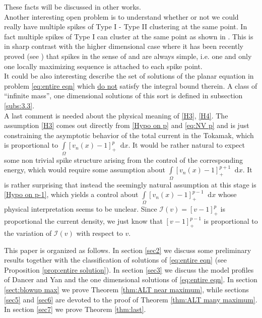 \documentclass[10pt]{amsart}
\newcommand{\dd}{\mathop{}\!\mathrm{d}}
\newcommand{\un}[1]{\underline{#1}}
\begin{document}
These facts will be discussed in other works.\\


Another interesting open problem is to understand whether or not we could really have multiple spikes of Type I - Type II
clustering at the same point. In fact multiple spikes of Type I can cluster at the same point as shown in \cite{DY}.
This is in sharp contrast with the higher dimensional case where it has been recently proved (see \cite{CM})
that spikes in the sense of \cite{FW} and \cite{W}  are always simple, i.e. one and only
one locally maximizing sequence is attached to each spike point.\\


It could be also interesting describe the set of solutions of the planar equation in problem \eqref{eq:entire eqn} which \un{do not} satisfy the integral
bound therein. A class of ``infinite mass'', one dimensional solutions of this sort is defined in subsection \ref{subs:3.3}.\\


A last comment is needed about the physical meaning of \eqref{H3}, \eqref{H4}. The assumption \eqref{H3} comes out directly from
\eqref{Hypo on p} and \eqref{eq:NV p} and is just constraining the asymptotic behavior of the total current in the Tokamak, which is proportional to
$\int\limits_{\Omega} [v_n(x)-1]_+^p\dd{x}$. It would be rather natural to expect some non trivial spike structure arising from
the control of the corresponding energy, which would require some assumption about $\int\limits_{\Omega} [v_n(x)-1]_+^{p+1}\dd{x}$.
It is rather surprising that instead the seemingly natural assumption at this stage is \eqref{Hypo on p-1}, which yields a control
about $\int\limits_{\Omega} [v_n(x)-1]_+^{p-1}\dd{x}$ whose physical interpretation seems to be unclear. Since
$\mathcal{I}(v)=[v-1]^p_+$ is proportional the current density, we just know that $[v-1]^{p-1}_+$ is proportional to the
variation of $\mathcal{I}(v)$ with respect to $v$.\\


\medskip

This paper is organized as follows. In section \ref{sec2} we discuss some preliminary results together with the classification of solutions of
\eqref{eq:entire eqn} (see Proposition \ref{prop:entire solution}). In section \ref{sec3} we discuss the model profiles of Dancer and Yan and the
one dimensional solutions of \eqref{eq:entire eqn}. In section \ref{sect:blowup max} we prove Theorem \ref{thm:ALT near maximum}, while sections
\ref{sec5} and \ref{sec6} are devoted to the proof of Theorem \ref{thm:ALT many maximum}. In section \ref{sec7} we prove Theorem \ref{thm:last}.
\end{document}
